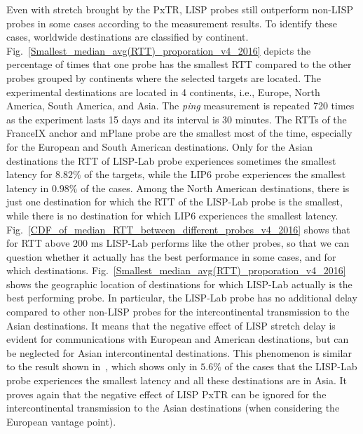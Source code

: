 Even with stretch brought by the PxTR, LISP probes still outperform non-LISP probes in some cases according to the measurement results. To identify these cases, worldwide destinations are classified by continent.
Fig.~\ref{Smallest_median_avg(RTT)_proporation_v4_2016} depicts the percentage of times that one probe has the smallest RTT compared to the other probes grouped by continents where the selected targets are located.
The experimental destinations are located in 4 continents, i.e., Europe, North America, South America, and Asia. The \emph{ping} measurement is repeated 720 times as the experiment lasts 15 days and its interval is 30 minutes. The RTTs of the FranceIX anchor and mPlane probe are the smallest most of the time, especially for the European and South American destinations. Only for the Asian destinations the RTT of LISP-Lab probe experiences sometimes the smallest latency for $8.82\%$ of the targets, while the LIP6 probe experiences the smallest latency in $0.98\%$ of the cases. Among the North American destinations, there is just one destination for which the RTT of the LISP-Lab probe is the smallest, while there is no destination for which LIP6 experiences the smallest latency. Fig.~\ref{CDF_of_median_RTT_between_different_probes_v4_2016} shows that for RTT above 200 ms LISP-Lab performs like the other probes, so that we can question whether it actually has the best performance in some cases, and for which destinations. Fig.~\ref{Smallest_median_avg(RTT)_proporation_v4_2016} shows the geographic location of destinations for which LISP-Lab actually is the best performing probe. In particular, the LISP-Lab probe has no additional delay compared to other non-LISP probes for the intercontinental transmission to the Asian destinations. It means that the negative effect of LISP stretch delay is evident for communications with European and American destinations, but can be neglected for Asian intercontinental destinations. This phenomenon is similar to the result shown in~\cite{li2016performance}, which shows only in $5.6\%$ of the cases that the LISP-Lab probe experiences the smallest latency and all these destinations are in Asia. It proves again that the negative effect of LISP PxTR can be ignored for the intercontinental transmission to the Asian destinations (when considering the European vantage point).

 \begin{table}[!tb]
 	\centering
 	\caption{Correlation coefficient to FranceIX (IPv4) from Dataset 2016}
 	\label{correlation_v4_2016}{
 	}
 \end{table}

